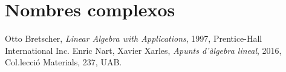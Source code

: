 \documentclass[11pt,fleqn]{book} %
\newcounter{let} \setcounter{let}{0}
\renewcommand{\1}{\mathbf{1}}
\newcommand{\0}{\mathbf{0}}
\begin{document}
\chapter{Nombres complexos}
{
\let\subsection\subsubsection
\let\subsubsection\paragraph

}






\begin{thebibliography}{20}
	Otto Bretscher,
	\textit{Linear Algebra with Applications},
	1997, Prentice-Hall International Inc.
	Enric Nart, Xavier Xarles,
	\textit{Apunts d'àlgebra lineal}, 2016, Col.lecci\'o Materials, 237, UAB.
\end{thebibliography}

\printbibliography[heading=bibempty]


\cleardoublepage %
\setlength{\columnsep}{0.75cm} %
\printindex %

\end{document}
